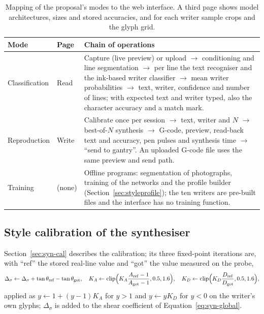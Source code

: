 \begin{table}[!htbp]
\centering
\fontsize{9.5}{11.5}\selectfont
\begin{tabularx}{\linewidth}{|p{2.1cm}|p{2.1cm}|X|}
\hline
\textbf{Mode} & \textbf{Page} & \textbf{Chain of operations} \\
\hline
Classification & Read & Capture (live preview) or upload $\rightarrow$ conditioning and line segmentation $\rightarrow$ per line the text recogniser and the ink-based writer classifier $\rightarrow$ mean writer probabilities $\rightarrow$ text, writer, confidence and number of lines; with expected text and writer typed, also the character accuracy and a match mark. \\
\hline
Reproduction & Write & Calibrate once per session $\rightarrow$ text, writer and $N$ $\rightarrow$ best-of-$N$ synthesis $\rightarrow$ G-code, preview, read-back text and accuracy, pen pulses and synthesis time $\rightarrow$ ``send to gantry''. An uploaded G-code file uses the same preview and send path. \\
\hline
Training & (none) & Offline programs: segmentation of photographs, training of the networks and the profile builder (Section~\ref{sec:styleprofile}); the ten writers are pre-built files and the interface has no training function. \\
\hline
\end{tabularx}
\caption{Mapping of the proposal's modes to the web interface. A third page shows model architectures, sizes and stored accuracies, and for each writer sample crops and the glyph grid.}
\label{tab:sys-modes}
\end{table}

\subsection{Style calibration of the synthesiser}

Section~\ref{sec:syn-cal} describes the calibration; its three fixed-point iterations are, with ``ref'' the stored real-line value and ``got'' the value measured on the probe,
\begin{equation}
\Delta_\sigma\leftarrow\Delta_\sigma+\tan\theta_{\mathrm{ref}}-\tan\theta_{\mathrm{got}},\quad K_A\leftarrow\operatorname{clip}\Bigl(K_A\frac{A_{\mathrm{ref}}-1}{A_{\mathrm{got}}-1},0.5,1.6\Bigr),\quad K_D\leftarrow\operatorname{clip}\Bigl(K_D\frac{D_{\mathrm{ref}}}{D_{\mathrm{got}}},0.5,1.6\Bigr),
\label{eq:syn-cal}
\end{equation}
applied as $y\leftarrow1+(y-1)K_A$ for $y>1$ and $y\leftarrow yK_D$ for $y<0$ on the writer's own glyphs; $\Delta_\sigma$ is added to the shear coefficient of Equation~\ref{eq:syn-global}.
